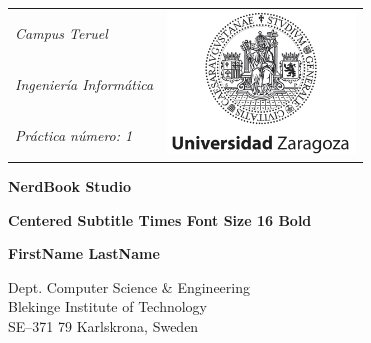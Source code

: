 \documentclass[a4paper,oneside]{report}
\begin{document}
\pagestyle{plain}


{\pagestyle{empty}
\changepage{5cm}{1cm}{-0.5cm}{-0.5cm}{}{-2cm}{}{}{}
\noindent
{\small
\begin{tabular}{p{} p{}}
\textit{Campus Teruel}&\multirow{4}{*}{\includegraphics[width=5cm]{../images/logo.png}}\\
\textit{Ingeniería Informática}\\
\textit{Práctica número: 1}\\
\end{tabular}}

\begin{center}

\par\vspace {7cm}

{\Huge\textbf{NerdBook Studio}}

\par\vspace {0.5cm}

{\Large\textbf{Centered Subtitle Times Font Size 16 Bold}}

\par\vspace {3cm}

{\Large\textbf{FirstName LastName}}
\par\vspace {7cm}

\end{center}

\noindent%
{\small Dept. Computer Science \& Engineering \\
Blekinge Institute of Technology\\
SE--371 79 Karlskrona, Sweden}

\clearpage
}
\tableofcontents
\end{document}
